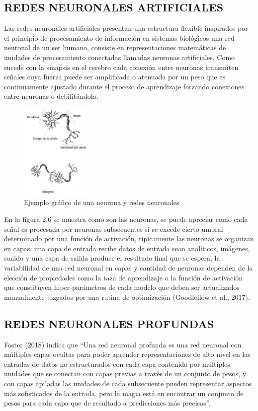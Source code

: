 \documentclass[letter, openright, 12pt]{book}
\newcommand*\setcaptioncitation[1]{\def\captioncitation{\textit{Fuente:}~#1}}
\let\captioncitation\relax
\begin{document}
\subsection{REDES NEURONALES ARTIFICIALES}
Las redes neuronales artificiales presentan una estructura flexible inspirados por el principio de procesamiento de información en sistemas biológicos una red neuronal de un ser humano, consiste en representaciones matemáticas de unidades de procesamiento conectadas llamadas neuronas artificiales. Como sucede con la sinapsis en el cerebro cada conexión entre neuronas transmiten señales cuya fuerza puede ser amplificada o atenuada por un peso que es continuamente ajustado durante el proceso de aprendizaje forzando conexiones entre neuronas o debilitándola. 


\begin{figure}[H]
\begin{center}
\includegraphics[width=0.3\textwidth]{figura2_6}
\setcaptioncitation{(MengZenzhu, 2020)}
\caption{Ejemplo gráfico de una neurona y redes neuronales}
\label{tab:figura2_6} 
\end{center}
\end{figure}



En la figura 2.6 se muestra como son las neuronas, se puede apreciar como cada señal es procesada por neuronas subsecuentes si se excede cierto umbral determinado por una función de activación, típicamente las neuronas se organizan en capas, una capa de entrada recibe datos de entrada sean analíticos, imágenes, sonido y una capa de salida produce el resultado final que se espera, la variabilidad de una red neuronal en capas y cantidad de neuronas dependen de la elección de propiedades como la taza de aprendizaje o la función de activación que constituyen hiper-parámetros de cada modelo que deben ser actualizados manualmente juzgados por una rutina de optimización (Goodfellow et al., 2017).

\subsection{REDES NEURONALES PROFUNDAS}
Foster (2018) indica que “Una red neuronal profunda es una red neuronal con múltiples capas ocultas para poder aprender representaciones de alto nivel en las entradas de datos no estructurados con cada capa contenida por múltiples unidades que se conectan con capas previas a través de un conjunto de pesos, y con capas apiladas las unidades de cada subsecuente pueden representar aspectos más sofisticados de la entrada, pero la magia está en encontrar un conjunto de pesos para cada capa que de resultado a predicciones más precisas”.
\end{document}
